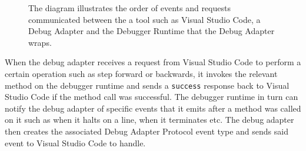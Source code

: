 \documentclass[12pt,pdftex,titlepage]{report}
\begin{document}
            \begin{figure}[htb!]
                \centering
                \caption[Sequence diagram of the Debug Adapter Protocol lifecycle]{The diagram illustrates the order of events and requests communicated between the a tool such as Visual Studio Code, a Debug Adapter and the Debugger Runtime that the Debug Adapter wraps.}
                \label{fig:dapflow}
            \end{figure}
            
            When the debug adapter receives a request from Visual Studio Code to perform a certain operation such as step forward or backwards, it invokes the relevant method on the debugger runtime and sends a \texttt{success} response back
            to Visual Studio Code if the method call was successful. The debugger runtime in turn can notify the debug adapter of specific events that it emits after a method was called on it such as when it halts on a line, when it terminates 
            etc. The debug adapter then creates the associated Debug Adapter Protocol event type and sends said event to Visual Studio Code to handle.
\end{document}
